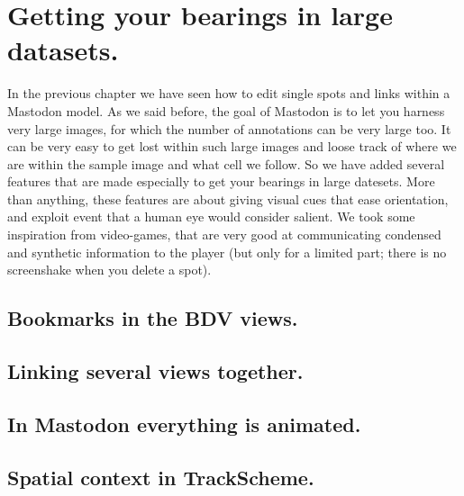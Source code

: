 \section{Getting your bearings in large datasets.}

In the previous chapter we have seen how to edit single spots and links within a Mastodon model.
As we said before, the goal of Mastodon is to let you harness very large images, for which the number of annotations can be very large too.
It can be very easy to get lost within such large images and loose track of where we are within the sample image and what cell we follow. 
So we have added several features that are made especially to get your bearings in large datesets.
More than anything, these features are about giving visual cues that ease orientation, and exploit event that a human eye would consider salient. 
We took some inspiration from video-games, that are very good at communicating condensed and synthetic information to the player
(but only for a limited part; there is no screenshake when you delete a spot).



\subsection{Bookmarks in the BDV views.}

\subsection{Linking several views together.}

\subsection{In Mastodon everything is animated.}

\subsection{Spatial context in TrackScheme.}